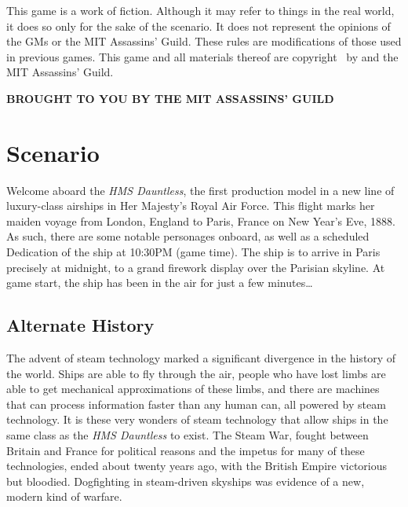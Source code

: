 \documentclass[sheet]{airship}
\begin{document}
\vfill

This game is a work of fiction.  Although it may refer to things in
the real world, it does so only for the sake of the scenario.  It does
not represent the opinions of the GMs or the MIT Assassins' Guild.
These rules are modifications of those used in previous games.  This
game and all materials thereof are copyright \the\year\ by
and the MIT
Assassins' Guild.

\vfill\vfill

\begin{center}\bf
  BROUGHT TO YOU BY THE MIT ASSASSINS' GUILD
\end{center}

\vfill

\clearpage
\setcounter{page}{1}
\parskip5pt

\section{Scenario}

Welcome aboard the {\it HMS Dauntless}, the first production model in a new line of luxury-class airships in Her Majesty's Royal Air Force.  This flight marks her maiden voyage from London, England to Paris, France on New Year's Eve, 1888.  As such, there are some notable personages onboard, as well as a scheduled Dedication of the ship at 10:30PM (game time).  The ship is to arrive in Paris precisely at midnight, to a grand firework display over the Parisian skyline. At game start, the ship has been in the air for just a few minutes\ldots{}

\subsection{Alternate History}

The advent of steam technology marked a significant divergence in the history of the world.  Ships are able to fly through the air, people who have lost limbs are able to get mechanical approximations of these limbs, and there are machines that can process information faster than any human can, all powered by steam technology.  It is these very wonders of steam technology that allow ships in the same class as the {\it HMS Dauntless} to exist.  The Steam War, fought between Britain and France for political reasons and the impetus for many of these technologies, ended about twenty years ago, with the British Empire victorious but bloodied. Dogfighting in steam-driven skyships was evidence of a new, modern kind of warfare. 
\end{document}
